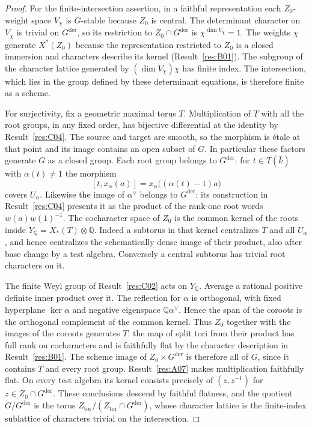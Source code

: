 \documentclass[11pt,a4paper,openany,oneside]{book}
\theoremstyle{resultstyle}
\theoremstyle{definition}
\numberwithin{equation}{chapter}
\newcommand{\QQ}{\mathbb{Q}}
\begin{document}
\begin{proof}
For the finite-intersection assertion, in a faithful representation
each \(Z_0\)-weight space \(V_\chi\) is \(G\)-stable because
\(Z_0\) is central. The determinant character on \(V_\chi\)
is trivial on \(G^{\mathrm{der}}\), so its restriction to
\(Z_0\cap G^{\mathrm{der}}\) is \(\chi^{\dim V_\chi}=1\).
The weights \(\chi\) generate \(X^*(Z_0)\) because the
representation restricted to \(Z_0\) is a closed immersion
and characters describe its kernel (Result~\ref{res:B01}).
The subgroup of the character lattice generated by
\((\dim V_\chi)\chi\) has finite index. The intersection,
which lies in the group defined by these determinant equations,
is therefore finite as a scheme.

For surjectivity, fix a geometric maximal torus \(T\).
Multiplication of \(T\) with all the root groups, in any
fixed order, has bijective differential at the identity by
Result~\ref{res:C04}. The source and target are smooth, so the
morphism is \'etale at that point and its image contains an open
subset of \(G\). In particular these factors generate \(G\)
as a closed group. Each root group belongs to \(G^{\mathrm{der}}\):
for \(t\in T(\bar k)\) with \(\alpha(t)\ne1\) the morphism
\[
 [t,x_\alpha(a)]=x_\alpha\big((\alpha(t)-1)a\big)
\]
covers \(U_\alpha\). Likewise the image of \(\alpha^\vee\)
belongs to \(G^{\mathrm{der}}\): its construction in
Result~\ref{res:C04} presents it as the product of the
rank-one root words \(w(a)w(1)^{-1}\).
The cocharacter space of \(Z_0\)
is the common kernel of the roots inside \(Y_\QQ=X_*(T)\otimes\QQ\).
Indeed a subtorus in that kernel centralizes \(T\) and all
\(U_\alpha\), and hence centralizes the schematically dense image
of their product, also after base change by a test algebra.
Conversely a central subtorus has trivial root characters on it.

The finite Weyl group of Result~\ref{res:C02} acts on \(Y_\QQ\).
Average a rational positive definite inner product over it.
The reflection for \(\alpha\) is orthogonal, with fixed
hyperplane \(\ker\alpha\) and negative eigenspace
\(\QQ\alpha^\vee\). Hence the span of the coroots is the
orthogonal complement of the common kernel.
Thus \(Z_0\) together with the images of the coroots generates
\(T\): the map of split tori from their product has full rank
on cocharacters and is faithfully flat by the character
description in Result~\ref{res:B01}. The scheme image of
\(Z_0\times G^{\mathrm{der}}\) is therefore all of \(G\),
since it contains \(T\) and every root group.
Result~\ref{res:A07} makes multiplication faithfully flat.
On every test algebra its kernel consists precisely of
\((z,z^{-1})\) for \(z\in Z_0\cap G^{\mathrm{der}}\).
These conclusions descend by faithful flatness, and the quotient
\(G/G^{\mathrm{der}}\) is the torus
\(Z_{\mathrm{tor}}/(Z_{\mathrm{tor}}\cap G^{\mathrm{der}})\),
whose character lattice is the finite-index sublattice of
characters trivial on the intersection.


\end{proof}
\end{document}
